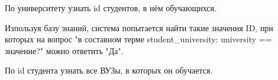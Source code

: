 \documentclass[12pt, a4paper]{extarticle}
\begin{document}
По университету узнать id студентов, в нём обучающихся.\par
\begin{figure}[h!]
	\begin{minipage}[h]{0.31\linewidth}
	\end{minipage}
	\hfill
	\begin{minipage}[h]{0.31\linewidth}
	\end{minipage}
	\hfill
	\begin{minipage}[h]{0.31\linewidth}
	\end{minipage}
\end{figure}\par
Изпользуя базу знаний, система попытается найти такие значения ID, при которых на вопрос "в составном терме student\_university: university == значение?" можно ответить "Да".\par
По id студента узнать все ВУЗы, в которых он обучается.
\end{document}

